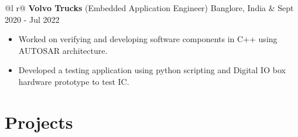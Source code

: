 \documentclass[a4paper,10pt]{article}
\begin{document}
\begin{tabularx}{\linewidth}{ @{}l r@{} }
    \textbf{Volvo Trucks} (Embedded Application Engineer) Banglore, India & \hfill {\small Sept 2020 - Jul 202}2 \\[2.75pt]
    {
        \begin{minipage}[t]{\linewidth}
            \begin{itemize}[nosep,after=\strut, leftmargin=2em, itemsep=3pt]
                \item Worked on verifying and developing software components in C++ using AUTOSAR architecture. %
                \item Developed a testing application using python scripting and Digital IO box hardware prototype to test IC.
            \end{itemize}
        \end{minipage}
    }
\end{tabularx}

\vspace{-0.1cm}
\section{Projects}

\end{document}

